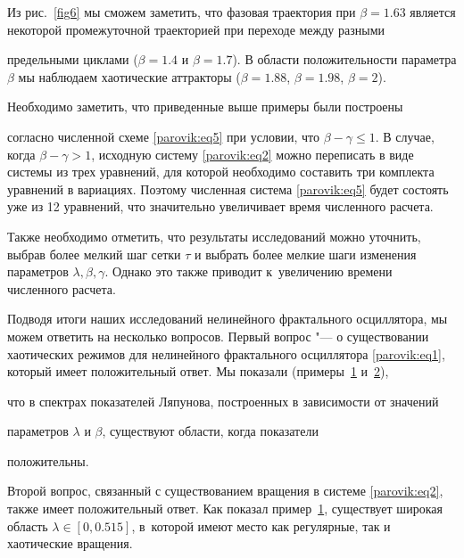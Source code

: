 Из рис.~\ref{fig6}  мы сможем заметить, что фазовая траектория при $\beta  = 1.63$ является некоторой промежуточной траекторией при переходе между разными

предельными циклами ($\beta  = 1.4$ и $\beta  = 1.7$). В области положительности параметра  $\beta $ мы наблюдаем хаотические аттракторы ($\beta  = 1.88$, $\beta  = 1.98$, $\beta  = 2$).



\begin{remark}

Необходимо заметить, что приведенные выше примеры были построены

согласно численной схеме \eqref{parovik:eq5} при условии, что $\beta  - \gamma  \le 1$. В случае, когда  $\beta  - \gamma  > 1$, исходную систему \eqref{parovik:eq2} можно переписать в виде системы из трех уравнений, для которой необходимо составить три комплекта уравнений в вариациях. Поэтому численная система \eqref{parovik:eq5} будет состоять уже из 12 уравнений, что значительно увеличивает время численного расчета. 

Также необходимо отметить, что результаты исследований можно уточнить, выбрав более мелкий шаг сетки $\tau $ и  выбрать более мелкие шаги изменения параметров  $\lambda,\beta,\gamma $. Однако это также приводит к~увеличению времени численного расчета.	

\end{remark} 



\smallskip



 Подводя итоги наших исследований нелинейного фрактального осциллятора, мы можем ответить на несколько вопросов. Первый вопрос "--- о существовании хаотических режимов для нелинейного фрактального осциллятора \eqref{parovik:eq1}, который имеет положительный ответ. Мы показали (примеры~\hyperlink{par:ex1}{1} и~\hyperlink{par:ex2}{2}),

что в спектрах показателей Ляпунова, построенных в зависимости от значений

параметров $\lambda $ и $\beta $, существуют области, когда показатели

положительны.



Второй вопрос, связанный с существованием вращения в системе \eqref{parovik:eq2}, также имеет положительный ответ. Как показал пример~\hyperlink{par:ex1}{1}, существует широкая область $\lambda\in \left[ {0,0.515} \right]$, в~которой имеют место как регулярные, так и хаотические вращения.




